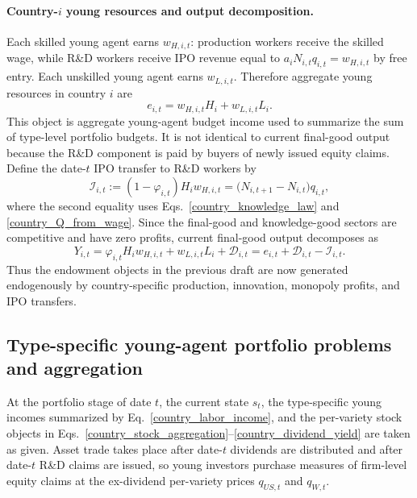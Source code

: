 \documentclass{article}
\begin{document}
\paragraph{Country-$i$ young resources and output decomposition.}
Each skilled young agent earns $w_{H,i,t}$: production workers receive the skilled wage, while R\&D workers receive IPO revenue equal to $a_iN_{i,t}q_{i,t}=w_{H,i,t}$ by free entry. Each unskilled young agent earns $w_{L,i,t}$. Therefore aggregate young resources in country $i$ are
\begin{equation}\label{country_labor_income}
e_{i,t}=w_{H,i,t}H_i+w_{L,i,t}L_i.
\end{equation}
This object is aggregate young-agent budget income used to summarize the sum of type-level portfolio budgets. It is not identical to current final-good output because the R\&D component is paid by buyers of newly issued equity claims. Define the date-$t$ IPO transfer to R\&D workers by
\begin{equation}\label{country_ipo_transfer}
\mathcal I_{i,t}
:=(1-\varphi_{i,t})H_iw_{H,i,t}
=\bigl(N_{i,t+1}-N_{i,t}\bigr)q_{i,t},
\end{equation}
where the second equality uses Eqs.~\eqref{country_knowledge_law} and \eqref{country_Q_from_wage}. Since the final-good and knowledge-good sectors are competitive and have zero profits, current final-good output decomposes as
\begin{equation}\label{country_output_income_identity}
Y_{i,t}
=
\varphi_{i,t}H_iw_{H,i,t}+w_{L,i,t}L_i+\mathcal D_{i,t}
=
e_{i,t}+\mathcal D_{i,t}-\mathcal I_{i,t}.
\end{equation}
Thus the endowment objects in the previous draft are now generated endogenously by country-specific production, innovation, monopoly profits, and IPO transfers.


\subsection{Type-specific young-agent portfolio problems and aggregation}

At the portfolio stage of date $t$, the current state $s_t$, the type-specific young incomes summarized by Eq.~\eqref{country_labor_income}, and the per-variety stock objects in Eqs.~\eqref{country_stock_aggregation}--\eqref{country_dividend_yield} are taken as given. Asset trade takes place after date-$t$ dividends are distributed and after date-$t$ R\&D claims are issued, so young investors purchase measures of firm-level equity claims at the ex-dividend per-variety prices $q_{US,t}$ and $q_{W,t}$.
\end{document}
